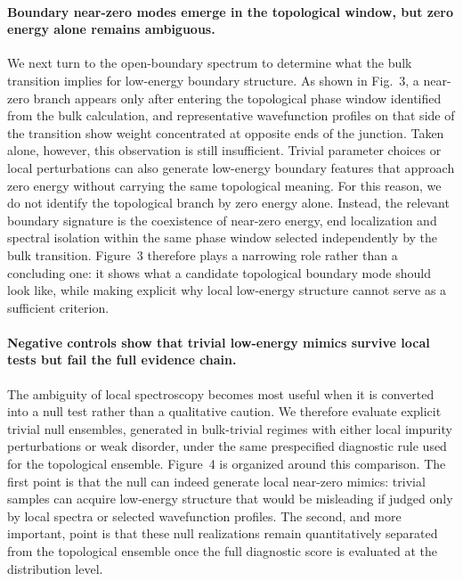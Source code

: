 \paragraph{Boundary near-zero modes emerge in the topological window, but zero energy alone remains ambiguous.}
We next turn to the open-boundary spectrum to determine what the bulk transition implies for low-energy boundary structure. As shown in Fig.~3, a near-zero branch appears only after entering the topological phase window identified from the bulk calculation, and representative wavefunction profiles on that side of the transition show weight concentrated at opposite ends of the junction. Taken alone, however, this observation is still insufficient. Trivial parameter choices or local perturbations can also generate low-energy boundary features that approach zero energy without carrying the same topological meaning. For this reason, we do not identify the topological branch by zero energy alone. Instead, the relevant boundary signature is the coexistence of near-zero energy, end localization and spectral isolation within the same phase window selected independently by the bulk transition. Figure~3 therefore plays a narrowing role rather than a concluding one: it shows what a candidate topological boundary mode should look like, while making explicit why local low-energy structure cannot serve as a sufficient criterion.

\paragraph{Negative controls show that trivial low-energy mimics survive local tests but fail the full evidence chain.}
The ambiguity of local spectroscopy becomes most useful when it is converted into a null test rather than a qualitative caution. We therefore evaluate explicit trivial null ensembles, generated in bulk-trivial regimes with either local impurity perturbations or weak disorder, under the same prespecified diagnostic rule used for the topological ensemble. Figure~4 is organized around this comparison. The first point is that the null can indeed generate local near-zero mimics: trivial samples can acquire low-energy structure that would be misleading if judged only by local spectra or selected wavefunction profiles. The second, and more important, point is that these null realizations remain quantitatively separated from the topological ensemble once the full diagnostic score is evaluated at the distribution level.

